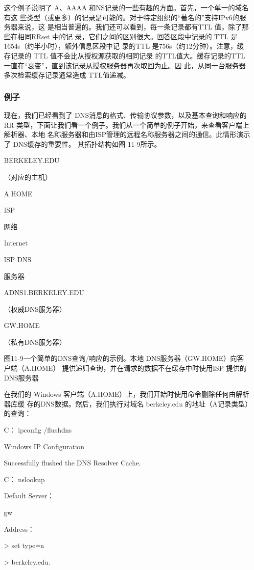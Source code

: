 这个例子说明了 A、AAAA 和NS记录的一些有趣的方面。首先，一个单一的域名有这
些类型（或更多）的记录是可能的。对于特定组织的“著名的”支持IPv6的服务器来说，这
是相当普遍的。我们还可以看到，每一条记录都有TTL 值，除了那些在相同RRset 中的记
录，它们之间的区别很大。回答区段中记录的 TTL 是1654s（约半小时），额外信息区段中记
录的TTL 是756s（约12分钟）。注意，缓存记录的 TTL 值不会比从授权源获取的相同记录
的TTL值大。缓存记录的TTL 一直在“衰变”，直到该记录从授权服务器再次取回为止。因
此，从同一台服务器多次检索缓存记录通常造成 TTL值递减。

\subsubsection{例子}

现在，我们已经看到了 DNS消息的格式、传输协议参数，以及基本查询和响应的RR
类型，下面让我们看一个例子。我们从一个简单的例子开始，来查看客户端上解析器、本地
名称服务器和由ISP管理的远程名称服务器之间的通信。此情形演示了 DNS缓存的重要性。
其拓扑结构如图 11-9所示。

BERKELEY.EDU

（对应的主机）

A.HOME

ISP

网络

Internet

ISP DNS

服务器

ADNS1.BERKELEY.EDU

（权威DNS服务器）

GW.HOME

（私有DNS服务器）

图11-9一个简单的DNS查询/响应的示例。本地 DNS服务器（GW.HOME）向客户端（A.HOME）
提供递归查询，并在请求的数据不在缓存中时使用ISP 提供的 DNS服务器

在我们的 Windows 客户端（A.HOME）上，我们开始时使用命令删除任何由解析器库缓
存的DNS数据。然后，我们执行对域名 berkeley.edu 的地址（A记录类型）的查询：

C：\> ipconfig /flushdns

Windows IP Configuration

Successfully flushed the DNS Resolver Cache.

C：\> nslookup

Default Server：

gw

Address：

> set type=a

> berkeley.edu.

